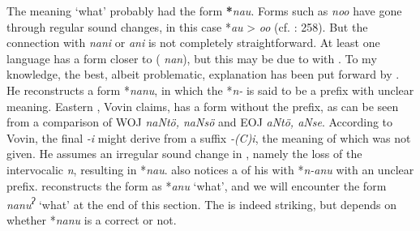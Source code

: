 \newpage 
The   meaning ‘what’ probably had the form \textbf{*}\textit{nau}. Forms such as  \textit{noo} have gone through regular sound changes, in this case *\textit{au} > \textit{oo} (cf. \citealt{Davis2015}: 258). But the connection with  \textit{nani} or  \textit{ani} is not completely straightforward. At least one   language has a form closer to  ( \textit{nan}), but this may be due to  with . To my knowledge, the best, albeit problematic, explanation has been put forward by \cite[305–313]{Vovin2005}. He reconstructs a  form *\textit{nanu}, in which the *\textit{n-} is said to be a prefix with unclear meaning. Eastern , Vovin claims, has a form without the prefix, as can be seen from a comparison of WOJ \textit{naNtö, naNsö} and EOJ \textit{aNtö, aNse}. According to Vovin, the final \textit{-i} might derive from a suffix \textit{-(C)i}, the meaning of which was not given. He assumes an irregular sound change in  , namely the loss of the intervocalic \textit{n}, resulting in *\textit{nau}. \citet[313]{Vovin2005} also notices a  of his  with  *\textit{n-anu} with an unclear prefix. \citet[310]{Blust2013} reconstructs the  form as *\textit{anu} ‘what’, and we will encounter the  form \textit{nanu\textsuperscript{ʔ}} ‘what’ at the end of this section. The  is indeed striking, but depends on whether  *\textit{nanu} is a correct  or not.

